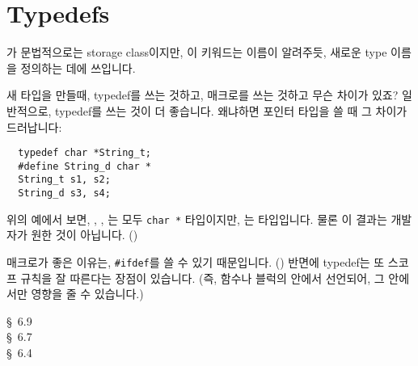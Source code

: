 \section{Typedefs}	\label{sec:typedef}
가 문법적으로는 storage class이지만, 이 키워드는 
이름이 알려주듯, 새로운 type 이름을 정의하는 데에
쓰입니다.

\begin{faq}
        새 타입을 만들때, typedef를 쓰는 것하고, 매크로를 쓰는 것하고 무슨 
        차이가 있죠?
\A
        일반적으로, typedef를 쓰는 것이 더 좋습니다. 왜냐하면 포인터 타입을
        쓸 때 그 차이가 드러납니다:
\begin{verbatim}
  typedef char *String_t;
  #define String_d char *
  String_t s1, s2;
  String_d s3, s4;
\end{verbatim}
        위의 예에서 보면, , , 는 모두 \verb+char *+
        타입이지만, 는  타입입니다. 물론 이 결과는 개발자가
        원한 것이 아닙니다.
        ()

        매크로가 좋은 이유는, \verb+#ifdef+를 쓸 수 있기 때문입니다. 
        () 반면에 typedef는 또 스코프 규칙을 잘 
        따른다는 장점이 있습니다. (즉, 함수나 블럭의 안에서 선언되어,
        그 안에서만 영향을 줄 수 있습니다.)

\R
        \cite{kr1} \S\ 6.9  \\
        \cite{kr2} \S\ 6.7  \\
        \cite{ctp} \S\ 6.4 
\end{faq}

